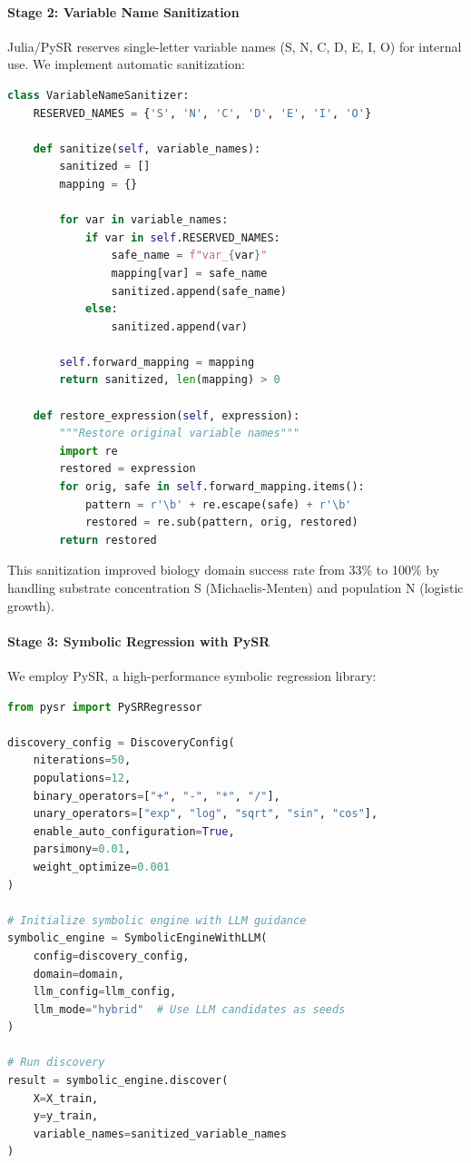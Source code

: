 \documentclass[twoside,11pt]{article}
\begin{document}
\paragraph{Stage 2: Variable Name Sanitization}

Julia/PySR reserves single-letter variable names (S, N, C, D, E, I, O) for internal use. We implement automatic sanitization:

\begin{lstlisting}[language=Python, caption=Variable Name Sanitization]
class VariableNameSanitizer:
    RESERVED_NAMES = {'S', 'N', 'C', 'D', 'E', 'I', 'O'}
    
    def sanitize(self, variable_names):
        sanitized = []
        mapping = {}
        
        for var in variable_names:
            if var in self.RESERVED_NAMES:
                safe_name = f"var_{var}"
                mapping[var] = safe_name
                sanitized.append(safe_name)
            else:
                sanitized.append(var)
        
        self.forward_mapping = mapping
        return sanitized, len(mapping) > 0
    
    def restore_expression(self, expression):
        """Restore original variable names"""
        import re
        restored = expression
        for orig, safe in self.forward_mapping.items():
            pattern = r'\b' + re.escape(safe) + r'\b'
            restored = re.sub(pattern, orig, restored)
        return restored
\end{lstlisting}

This sanitization improved biology domain success rate from 33\% to 100\% by handling substrate concentration S (Michaelis-Menten) and population N (logistic growth).


\paragraph{Stage 3: Symbolic Regression with PySR}

We employ PySR, a high-performance symbolic regression library:

\begin{lstlisting}[language=Python, caption=Symbolic Regression Configuration]
from pysr import PySRRegressor

discovery_config = DiscoveryConfig(
    niterations=50,
    populations=12,
    binary_operators=["+", "-", "*", "/"],
    unary_operators=["exp", "log", "sqrt", "sin", "cos"],
    enable_auto_configuration=True,
    parsimony=0.01,
    weight_optimize=0.001
)

# Initialize symbolic engine with LLM guidance
symbolic_engine = SymbolicEngineWithLLM(
    config=discovery_config,
    domain=domain,
    llm_config=llm_config,
    llm_mode="hybrid"  # Use LLM candidates as seeds
)

# Run discovery
result = symbolic_engine.discover(
    X=X_train,
    y=y_train,
    variable_names=sanitized_variable_names
)
\end{lstlisting}
\end{document}
